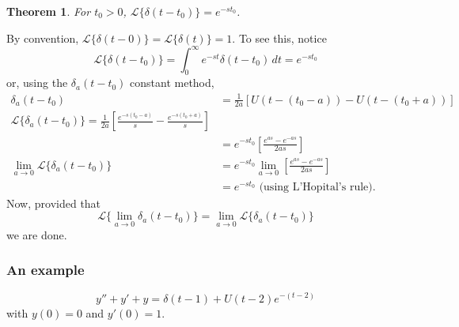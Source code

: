 \documentclass[11pt]{article}
\newtheorem{thm}{Theorem}[section]
\newcommand{\lap}{\mathcal{L}}
\newcommand{\intzi}{\int_0^{\infty}}
\begin{document}
	\begin{thm}
		For $t_0 > 0$, $\lap\{\delta (t-t_0)\} = e^{-st_0}$.
	\end{thm}

	By convention, $\lap\{\delta(t-0)\} = \lap\{\delta(t)\} = 1$. To see this, notice
		$$ \lap\{\delta(t-t_0)\} = \intzi e^{-st} \delta(t-t_0) \, dt = e^{-st_0} $$
	or, using the $\delta_a (t-t_0)$ constant method,
		\begin{align*}
			\delta_a (t-t_0) &= \frac{1}{2a} [U(t-(t_0 - a)) - U(t - (t_0 + a))] \\
			\lap\{\delta_a (t-t_0)\} = \frac{1}{2a} \left[\frac{e^{-s(t_0 -a)}}{s} -\frac{e^{-s(t_0 + a)}}{s} \right] \\
				&= e^{-st_0} \left[\frac{e^{as} - e^{-as}}{2as}\right] \\
			\lim_{a \to 0} \lap\{\delta_a (t-t_0)\} &= e^{-st_0} \lim_{a \to 0} \left[\frac{e^{as} - e^{-as}}{2as}\right] \\
				&= e^{-s t_0} \text{ (using L'Hopital's rule)} .
		\end{align*}
	Now, provided that
		$$ \lap\{\lim_{a \to 0} \delta_a (t-t_0)\} = \lim_{a \to 0} \lap\{\delta_a (t-t_0)\} $$
	we are done.
\subsubsection{An example}
		\[
			y'' + y' + y = \delta(t - 1) + U(t-2) e^{-(t-2)}
		\]
	with $y(0) = 0$ and $y'(0) = 1$.
\end{document}
